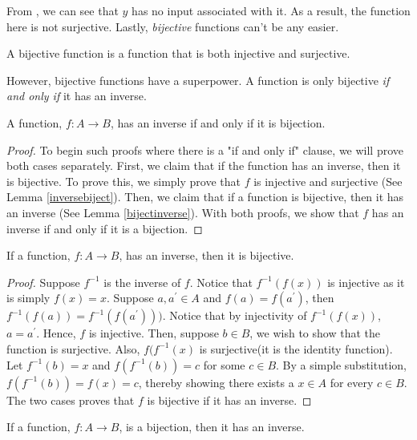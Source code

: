 From , we can see that \(y\) has no input associated with it. As a result, the function here is not surjective. Lastly, \textit{bijective} functions can't be any easier.
\begin{definition}
  A bijective function is a function that is both injective and surjective. 
\end{definition}


However, bijective functions have a superpower. A function is only bijective \textit{if and only if} it has an inverse. 
\begin{theorem}
  A function, \(f:A \to B\), has an inverse if and only if it is bijection.
\end{theorem}
\begin{proof}
  To begin such proofs where there is a "if and only if" clause, we will prove both cases separately. First, we claim that if the function has an inverse, then it is bijective. To prove this, we simply prove that \(f\) is injective and surjective (See Lemma \ref{inversebiject}). Then, we claim that if a function is bijective, then it has an inverse (See Lemma \ref{bijectinverse}). With both proofs, we show that \(f\) has an inverse if and only if it is a bijection.
\end{proof}
\begin{lemma}
  If a function, \(f: A \to B\), has an inverse, then it is bijective. 
  \label{inversebiject}
\end{lemma}
\begin{proof}
  Suppose \(f^{-1}\) is the inverse of \(f\). Notice that \(f^{-1}(f(x))\) is injective as it is simply \(f(x)=x\). Suppose \(a, a^\prime \in A\) and \(f(a)=f(a^\prime)\), then \(f^{-1}(f(a))=f^{-1}(f(a^\prime)))\). Notice that by injectivity of \(f^{-1}(f(x))\), \(a=a^\prime\). Hence, \(f\) is injective. Then, suppose \(b \in B\), we wish to show that the function is surjective. Also, \(f(f^{-1}(x)\) is surjective(it is the identity function). Let \(f^{-1}(b)=x\) and \(f(f^{-1}(b))=c\) for some \(c \in B\). By a simple substitution, \(f(f^{-1}(b))=f(x)=c\), thereby showing there exists a \(x \in A\) for every \(c \in B\). The two cases proves that \(f\) is bijective if it has an inverse.
\end{proof}
\begin{lemma}
  If a function, \(f: A \to B\), is a bijection, then it has an inverse.

  \label{bijectinverse}
\end{lemma}

